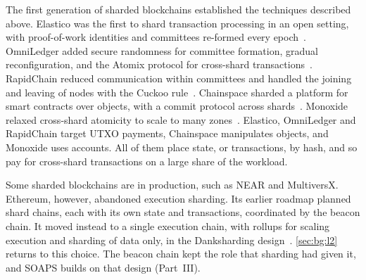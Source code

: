 
The first generation of sharded blockchains established the techniques described above.
Elastico was the first to shard transaction processing in an open setting, with proof-of-work identities and committees re-formed every epoch~\cite{elastico}.
OmniLedger added secure randomness for committee formation, gradual reconfiguration, and the Atomix protocol for cross-shard transactions~\cite{omniLedger}.
RapidChain reduced communication within committees and handled the joining and leaving of nodes with the Cuckoo rule~\cite{rapidchain}.
Chainspace sharded a platform for smart contracts over objects, with a commit protocol across shards~\cite{albassam2018chainspace}.
Monoxide relaxed cross-shard atomicity to scale to many zones~\cite{wang2019monoxide}. 
Elastico, OmniLedger and RapidChain target UTXO payments, Chainspace manipulates objects, and Monoxide uses accounts. All of them place state, or transactions, by hash, and so pay for cross-shard transactions on a large share of the workload. 

Some sharded blockchains are in production, such as NEAR and MultiversX. 
Ethereum, however, abandoned execution sharding.
Its earlier roadmap planned shard chains, each with its own state and transactions, coordinated by the beacon chain.
It moved instead to a single execution chain, with rollups for scaling execution and sharding of data only, in the Danksharding design~\cite{feist2022newsharding,ethdanksharding}.
\autoref{sec:bg:l2} returns to this choice.
The beacon chain kept the role that sharding had given it, and SOAPS builds on that design (Part~III).

